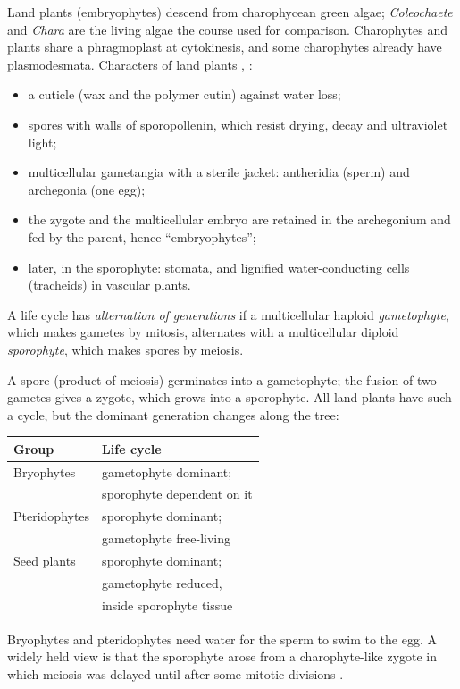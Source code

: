 Land plants (embryophytes) descend from
charophycean green algae; \emph{Coleochaete}
and \emph{Chara} are the living algae the
course used for comparison. Charophytes and
plants share a phragmoplast at cytokinesis,
and some charophytes already have
plasmodesmata. Characters of land plants
\cite[Chapter 16]{evert2013raven},
\cite[Chapter 3]{willis2002evolution}:
\begin{itemize}
\item a cuticle (wax and the polymer cutin)
against water loss;
\item spores with walls of sporopollenin,
which resist drying, decay and ultraviolet
light;
\item multicellular gametangia with a
sterile jacket: antheridia (sperm) and
archegonia (one egg);
\item the zygote and the multicellular
embryo are retained in the archegonium and
fed by the parent, hence ``embryophytes'';
\item later, in the sporophyte: stomata,
and lignified water-conducting cells
(tracheids) in vascular plants.
\end{itemize}

\begin{definition}
\label{definition-alternation-of-generations}
A life cycle has \emph{alternation of
generations} if a multicellular haploid
\emph{gametophyte}, which makes gametes by
mitosis, alternates with a multicellular
diploid \emph{sporophyte}, which makes
spores by meiosis.
\end{definition}

A spore (product of meiosis) germinates
into a gametophyte; the fusion of two
gametes gives a zygote, which grows into a
sporophyte. All land plants have such a
cycle, but the dominant generation changes
along the tree:
\begin{center}
\begin{tabular}{ll}
Group & Life cycle \\
\hline
Bryophytes & gametophyte dominant; \\
& sporophyte dependent on it \\
Pteridophytes & sporophyte dominant; \\
& gametophyte free-living \\
Seed plants & sporophyte dominant; \\
& gametophyte reduced, \\
& inside sporophyte tissue \\
\end{tabular}
\end{center}
Bryophytes and pteridophytes need water for
the sperm to swim to the egg. A widely held
view is that the sporophyte arose from a
charophyte-like zygote in which meiosis was
delayed until after some mitotic divisions
\cite[Chapter 16]{evert2013raven}.

